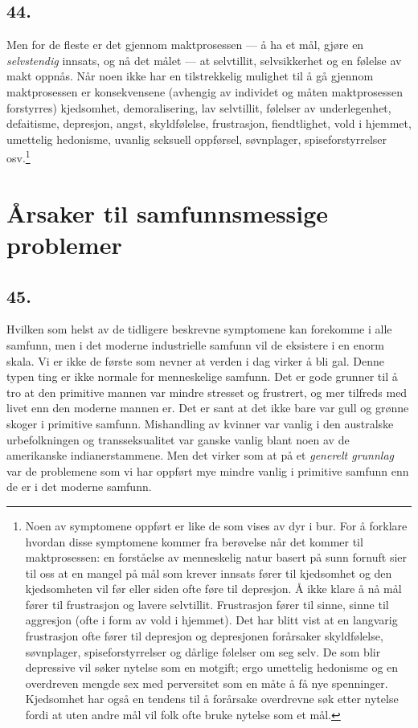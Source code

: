 \documentclass[oneside]{book}
\begin{document}
\section*{44.}
Men for de fleste er det gjennom maktprosessen --- å ha et mål, gjøre en
\emph{selvstendig} innsats, og nå det målet --- at selvtillit, selvsikkerhet og
en
følelse av makt oppnås. Når noen ikke har en tilstrekkelig mulighet til å gå
gjennom maktprosessen er konsekvensene (avhengig av individet og måten
maktprosessen forstyrres) kjedsomhet, demoralisering, lav selvtillit, følelser
av underlegenhet, defaitisme, depresjon, angst, skyldfølelse, frustrasjon,
fiendtlighet, vold i hjemmet, umettelig hedonisme, uvanlig seksuell oppførsel,
søvnplager, spiseforstyrrelser osv.\footnote{Noen av symptomene oppført er
like de som vises av dyr i bur. For å forklare hvordan disse symptomene kommer
fra berøvelse når det kommer til maktprosessen: en forståelse av menneskelig
natur basert på sunn fornuft sier til oss at en mangel på mål som krever
innsats fører til kjedsomhet og den kjedsomheten vil før eller siden ofte føre
til depresjon. Å ikke klare å nå mål fører til frustrasjon og lavere
selvtillit. Frustrasjon fører til sinne, sinne til aggresjon (ofte i form av
vold i hjemmet). Det har blitt vist at en langvarig frustrasjon ofte fører til
depresjon og depresjonen forårsaker skyldfølelse, søvnplager,
spiseforstyrrelser og dårlige følelser om seg selv. De som blir depressive vil
søker nytelse som en motgift; ergo umettelig hedonisme og en overdreven mengde
sex med perversitet som en måte å få nye spenninger. Kjedsomhet har også en
tendens til å forårsake overdrevne søk etter nytelse fordi at uten andre mål
vil folk ofte bruke nytelse som et mål.}

\chapter{Årsaker til samfunnsmessige problemer}
\section*{45.}
Hvilken som helst av de tidligere beskrevne symptomene kan forekomme i alle
samfunn, men i det moderne industrielle samfunn vil de eksistere i en enorm
skala. Vi er ikke de første som nevner at verden i dag virker å bli gal. Denne
typen ting er ikke normale for menneskelige samfunn. Det er gode grunner til å
tro at den primitive mannen var mindre stresset og frustrert, og mer tilfreds
med livet enn den moderne mannen er. Det er sant at det ikke bare var gull og
grønne skoger i primitive samfunn. Mishandling av kvinner var vanlig i den
australske urbefolkningen og transseksualitet var ganske vanlig blant noen av
de amerikanske indianerstammene. Men det virker som at på et \emph{generelt
grunnlag} var de problemene som vi har oppført mye mindre vanlig i primitive
samfunn enn de er i det moderne samfunn.
\end{document}
